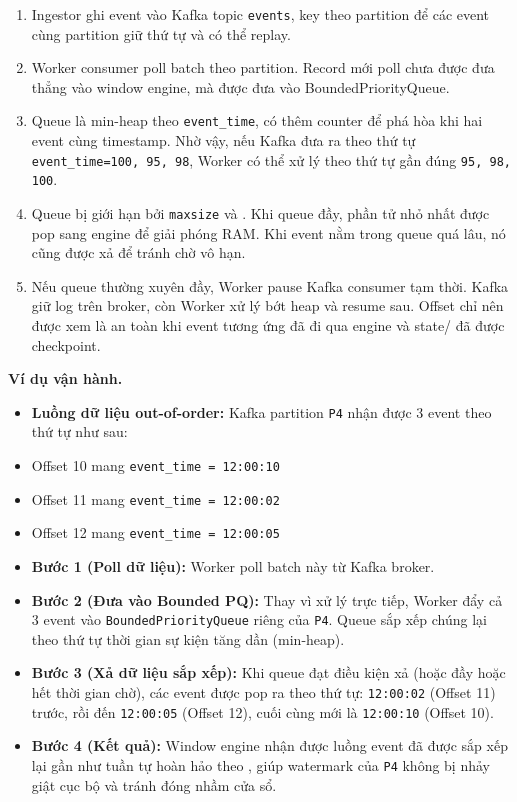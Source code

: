 \documentclass[12pt,a4paper]{article}
\begin{document}
\begin{enumerate}
\item Ingestor ghi event vào Kafka topic \texttt{events}, key theo partition để các event cùng partition giữ thứ tự  và có thể replay.
\item Worker consumer poll batch theo partition. Record mới poll chưa được đưa thẳng vào window engine, mà được đưa vào BoundedPriorityQueue.
\item Queue là min-heap theo \texttt{event\_time}, có thêm counter để phá hòa khi hai event cùng timestamp. Nhờ vậy, nếu Kafka đưa ra  theo thứ tự \texttt{event\_time=100, 95, 98}, Worker có thể xử lý theo thứ tự gần đúng \texttt{95, 98, 100}.
\item Queue bị giới hạn bởi \texttt{maxsize} và . Khi queue đầy, phần tử nhỏ nhất được pop sang engine để giải phóng RAM. Khi event nằm trong queue quá lâu, nó cũng được xả để tránh chờ vô hạn.
\item Nếu queue thường xuyên đầy, Worker pause Kafka consumer tạm thời. Kafka giữ log trên broker, còn Worker xử lý bớt heap và resume sau. Offset chỉ nên được xem là an toàn khi event tương ứng đã đi qua engine và state/ đã được checkpoint.
\end{enumerate}
\textbf{Ví dụ vận hành.}

\begin{itemize}
\item \textbf{Luồng dữ liệu out-of-order:} Kafka partition \texttt{P4} nhận được 3 event theo thứ tự  như sau:
\item Offset 10 mang \texttt{event\_time = 12:00:10}
\item Offset 11 mang \texttt{event\_time = 12:00:02}
\item Offset 12 mang \texttt{event\_time = 12:00:05}
\item \textbf{Bước 1 (Poll dữ liệu):} Worker poll batch này từ Kafka broker.
\item \textbf{Bước 2 (Đưa vào Bounded PQ):} Thay vì xử lý trực tiếp, Worker đẩy cả 3 event vào \texttt{BoundedPriorityQueue} riêng của \texttt{P4}. Queue sắp xếp chúng lại theo thứ tự thời gian sự kiện tăng dần (min-heap).
\item \textbf{Bước 3 (Xả dữ liệu sắp xếp):} Khi queue đạt điều kiện xả (hoặc đầy hoặc hết thời gian chờ), các event được pop ra theo thứ tự: \texttt{12:00:02} (Offset 11) trước, rồi đến \texttt{12:00:05} (Offset 12), cuối cùng mới là \texttt{12:00:10} (Offset 10).
\item \textbf{Bước 4 (Kết quả):} Window engine nhận được luồng event đã được sắp xếp lại gần như tuần tự hoàn hảo theo , giúp watermark của \texttt{P4} không bị nhảy giật cục bộ và tránh đóng nhầm cửa sổ.
\end{itemize}
\end{document}
